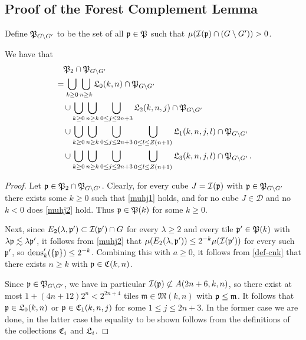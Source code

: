 \subsection{Proof of the Forest Complement Lemma}
\label{subsecantichain}

Define ${\mathfrak P}_{G \setminus G'}$ to be the set of all ${\mathfrak p} \in {\mathfrak P}$ such that $\mu({\mathcal{I}}({\mathfrak p}) \cap (G \setminus  G')) > 0$.
\begin{lemma}
    \label{antichain-decomposition}
    \leanok
    We have that
    \begin{align}
        \label{eq-fp'-decomposition}
        &\quad {\mathfrak P}_2 \cap {\mathfrak P}_{G \setminus G'}\\
        &= \bigcup_{k \ge 0} \bigcup_{n \ge k} {\mathfrak L}_0(k,n) \cap {\mathfrak P}_{G \setminus G'} \\
        &\quad\cup \bigcup_{k \ge 0} \bigcup_{n \ge k}\bigcup_{0 \le j \le 2n+3} {\mathfrak L}_2(k,n,j) \cap {\mathfrak P}_{G \setminus G'}\\
        &\quad\cup \bigcup_{k \ge 0} \bigcup_{n \ge k}\bigcup_{0 \le j \le 2n+3} \bigcup_{0 \le l \le Z(n+1)} {\mathfrak L}_1(k,n,j,l) \cap {\mathfrak P}_{G \setminus G'}\\
        &\quad\cup \bigcup_{k \ge 0} \bigcup_{n \ge k}\bigcup_{0 \le j \le 2n+3} \bigcup_{0 \le l \le Z(n+1)} {\mathfrak L}_3(k,n,j,l)\cap {\mathfrak P}_{G \setminus G'}\,.
    \end{align}
\end{lemma}

\begin{proof}
    \leanok
    Let ${\mathfrak p} \in {\mathfrak P}_2 \cap {\mathfrak P}_{G \setminus G'}$. Clearly, for every cube $J = {\mathcal{I}}({\mathfrak p})$ with ${\mathfrak p} \in {\mathfrak P}_{G \setminus G'}$ there exists some $k \ge 0$ such that \eqref{muhj1} holds, and for no cube $J \in \mathcal{D}$ and no $k < 0$ does \eqref{muhj2} hold. Thus ${\mathfrak p} \in {\mathfrak P}(k)$ for some $k \ge 0$.

    Next, since $E_2(\lambda, {\mathfrak p}') \subset {\mathcal{I}}({\mathfrak p}')\cap G$ for every $\lambda \ge 2$ and every tile ${\mathfrak p}' \in {\mathfrak P}(k)$ with $\lambda{\mathfrak p} \lesssim \lambda {\mathfrak p}'$, it follows from \eqref{muhj2} that $\mu(E_2(\lambda, {\mathfrak p}')) \le 2^{-k} \mu({\mathcal{I}}({\mathfrak p}'))$ for every such ${\mathfrak p}'$, so $\operatorname{\operatorname{dens}}_k'(\{{\mathfrak p}\}) \le 2^{-k}$. Combining this with $a \ge 0$, it follows from \eqref{def-cnk} that there exists $n\ge k$ with ${\mathfrak p} \in {\mathfrak C}(k,n)$.

    Since ${\mathfrak p} \in {\mathfrak P}_{G \setminus G'}$, we have in particular ${\mathcal{I}}({\mathfrak p}) \not \subset A(2n + 6, k, n)$, so there exist at most $1 + (4n + 12)2^n < 2^{2n+4}$ tiles $\mathfrak{m} \in \mathfrak{M}(k,n)$ with ${\mathfrak p} \le \mathfrak{m}$. It follows that ${\mathfrak p} \in {\mathfrak L}_0(k,n)$ or ${\mathfrak p} \in {\mathfrak C}_1(k,n,j)$ for some $1 \le j \le 2n + 3$. In the former case we are done, in the latter case the equality to be shown follows from the definitions of the collections ${\mathfrak C}_i$ and ${\mathfrak L}_i$.
\end{proof}

